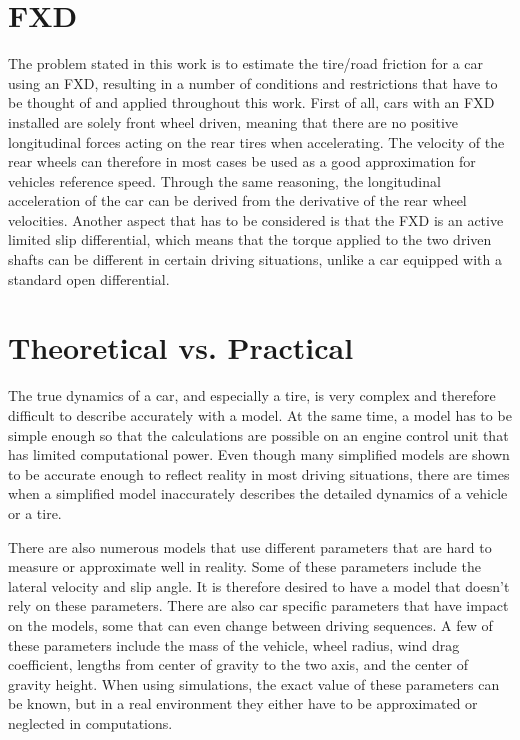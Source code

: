 \section{FXD}

The problem stated in this work is to estimate the tire/road friction for a car using an FXD, resulting in a number of conditions and restrictions that have to be thought of and applied throughout this work. First of all, cars with an FXD installed are solely front wheel driven, meaning that there are no positive longitudinal forces acting on the rear tires when accelerating. The velocity of the rear wheels can therefore in most cases be used as a good approximation for vehicles reference speed. Through the same reasoning, the longitudinal acceleration of the car can be derived from the derivative of the rear wheel velocities. Another aspect that has to be considered is that the FXD is an active limited slip differential, which means that the torque applied to the two driven shafts can be different in certain driving situations, unlike a car equipped with a standard open differential. 

\section{Theoretical vs. Practical}

The true dynamics of a car, and especially a tire, is very complex and therefore difficult to describe accurately with a model. At the same time, a model has to be simple enough so that the calculations are possible on an engine control unit that has limited computational power. Even though many simplified models are shown to be accurate enough to reflect reality in most driving situations, there are times when a simplified model inaccurately describes the detailed dynamics of a vehicle or a tire. 

There are also numerous models that use different parameters that are hard to measure or approximate well in reality. Some of these parameters include the lateral velocity and slip angle. It is therefore desired to have a model that doesn't rely on these parameters. There are also car specific parameters that have impact on the models, some that can even change between driving sequences. A few of these parameters include the mass of the vehicle, wheel radius, wind drag coefficient, lengths from center of gravity to the two axis, and the center of gravity height. When using simulations, the exact value of these parameters can be known, but in a real environment they either have to be approximated or neglected in computations.

